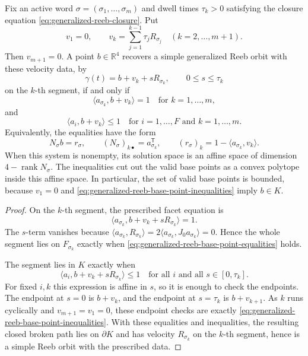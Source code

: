 \begin{lemma}\label{lem:generalized-reeb-base-point-recovery}
Fix an active word \(\sigma=(\sigma_1,\ldots,\sigma_m)\) and dwell times
\(\tau_k>0\) satisfying the closure equation
\eqref{eq:generalized-reeb-closure}. Put
\[
  v_1=0,
  \qquad
  v_k=\sum_{j=1}^{k-1}\tau_jR_{\sigma_j}
  \quad (k=2,\ldots,m+1).
\]
Then \(v_{m+1}=0\). A point \(b\in\mathbb{R}^4\) recovers a simple generalized Reeb orbit
with these velocity data, by
\[
  \gamma(t)=b+v_k+sR_{\sigma_k},
  \qquad 0\leq s\leq \tau_k
\]
on the \(k\)-th segment, if and only if
\begin{equation}\label{eq:generalized-reeb-base-point-equalities}
  \langle a_{\sigma_k}, b+v_k\rangle=1
  \quad\text{for }k=1,\ldots,m,
\end{equation}
and
\begin{equation}\label{eq:generalized-reeb-base-point-inequalities}
  \langle a_i,b+v_k\rangle\leq 1
  \quad\text{for }i=1,\ldots,F\text{ and }k=1,\ldots,m.
\end{equation}
Equivalently, the equalities have the form
\[
  N_\sigma b = r_\sigma,
  \qquad
  (N_\sigma)_{k\bullet}=a_{\sigma_k}^{\mathsf T},
  \qquad
  (r_\sigma)_k=1-\langle a_{\sigma_k},v_k\rangle .
\]
When this system is nonempty, its solution space is an affine space of
dimension \(4-\operatorname{rank}N_\sigma\). The inequalities cut out the
valid base points as a convex polytope inside this affine space. In particular,
the set of valid base points is bounded, because \(v_1=0\) and
\eqref{eq:generalized-reeb-base-point-inequalities} imply \(b\in K\).
\end{lemma}

\begin{proof}
On the \(k\)-th segment, the prescribed facet equation is
\[
  \langle a_{\sigma_k}, b+v_k+sR_{\sigma_k}\rangle=1.
\]
The \(s\)-term vanishes because
\(\langle a_{\sigma_k},R_{\sigma_k}\rangle
=2\langle a_{\sigma_k},J_0a_{\sigma_k}\rangle=0\). Hence the whole segment
lies on \(F_{\sigma_k}\) exactly when
\eqref{eq:generalized-reeb-base-point-equalities} holds.

The segment lies in \(K\) exactly when
\[
  \langle a_i,b+v_k+sR_{\sigma_k}\rangle\leq 1
  \quad\text{for all }i\text{ and all }s\in[0,\tau_k].
\]
For fixed \(i,k\) this expression is affine in \(s\), so it is enough to check
the endpoints. The endpoint at \(s=0\) is \(b+v_k\), and the endpoint at
\(s=\tau_k\) is \(b+v_{k+1}\). As \(k\) runs cyclically and \(v_{m+1}=v_1=0\),
these endpoint checks are exactly
\eqref{eq:generalized-reeb-base-point-inequalities}. With these equalities and
inequalities, the resulting closed broken path lies on \(\partial K\) and has
velocity \(R_{\sigma_k}\) on the \(k\)-th segment, hence is a simple Reeb orbit
with the prescribed data.
\end{proof}


